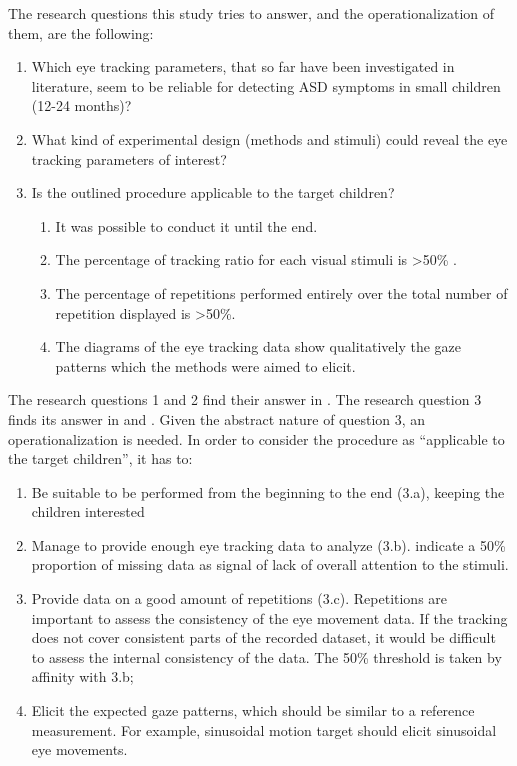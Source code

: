 The research questions this study tries to answer, and the operationalization of them, are the following:
\begin{enumerate}
    \item Which eye tracking parameters, that so far have been investigated in literature, seem to be reliable for detecting ASD symptoms in small children (12-24 months)?
    \item What kind of experimental design (methods and stimuli) could reveal the eye tracking parameters of interest?
    \item Is the outlined procedure applicable to the target children?
    \begin{enumerate}[label*=\alph*.]
        \item It was possible to conduct it until the end.
        \item The percentage of tracking ratio for each visual stimuli is >50\% \citep{sasson2012children}.
        \item The percentage of repetitions performed entirely over the total number of repetition displayed is >50\%.
        \item The diagrams of the eye tracking data show qualitatively the gaze patterns which the methods were aimed to elicit.
    \end{enumerate}
\end{enumerate}

The research questions 1 and 2 find their answer in  . The research question 3 finds its answer in  and . Given the abstract nature of question 3, an operationalization is needed. In order to consider the procedure as “applicable to the target children”, it has to:
\begin{enumerate}
    \item Be suitable to be performed from the beginning to the end (3.a), keeping the children interested
    \item Manage to provide enough eye tracking data to analyze (3.b). \cite{sasson2012children} indicate a 50\% proportion of missing data as signal of lack of overall attention to the stimuli.
    \item Provide data on a good amount of repetitions (3.c). Repetitions are important to assess the consistency of the eye movement data. If the tracking does not cover consistent parts of the recorded dataset, it would be difficult to assess the internal consistency of the data. The 50\% threshold is taken by affinity with 3.b;
    \item Elicit the expected gaze patterns, which should be similar to a reference measurement. For example, sinusoidal motion target should elicit sinusoidal eye movements.
\end{enumerate}


